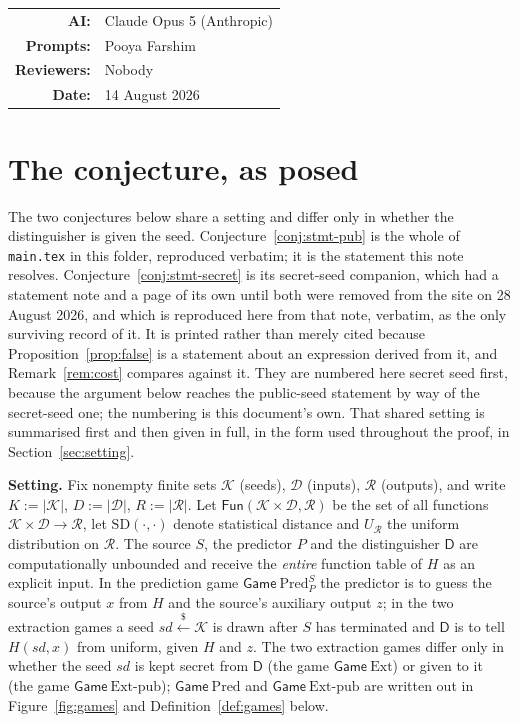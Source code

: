 \documentclass{aicr-solution}
\makeatletter
\newcommand{\Fun}{\mathsf{Fun}}
\newcommand{\Gm}{\mathsf{Game}}
\newcommand{\Pred}{\mathrm{Pred}}
\newcommand{\Ext}{\mathrm{Ext}}
\newcommand{\Extp}{\mathrm{Ext}\text{-}\mathrm{pub}}
\newcommand{\sd}{\mathit{sd}}
\renewcommand{\sample}{\stackrel{{\scriptscriptstyle\$}}{\leftarrow}}
\newcommand{\SD}{\mathrm{SD}}
\newcommand{\calK}{\mathcal{K}}
\newcommand{\calD}{\mathcal{D}}
\newcommand{\calR}{\mathcal{R}}
\newcommand{\AIModelsUsed}{Claude Opus 5 (Anthropic)}
\newcommand{\PromptedBy}{Pooya Farshim}
\newcommand{\ReviewedBy}{Nobody}
\newcommand{\PaperDate}{14 August 2026}
\newcommand{\AIDisclosure}{%
  \begingroup
  \small\centering
  \begin{tabular}{@{}rl@{}}
    \textbf{AI:} & \AIModelsUsed \\
    \textbf{Prompts:} & \PromptedBy \\
    \textbf{Reviewers:} & \ReviewedBy \\
    \textbf{Date:} & \PaperDate \\
  \end{tabular}
  \par
  \endgroup
}
\makeatother
\begin{document}

\vspace{0.6em}
\AIDisclosure

\vspace{1em}

\section*{The conjecture, as posed}\label{sec:posed}

The two conjectures below share a setting and differ only in whether the distinguisher is given
the seed. Conjecture~\ref{conj:stmt-pub} is the whole of \texttt{main.tex} in this folder,
reproduced verbatim; it is the statement this note resolves.
Conjecture~\ref{conj:stmt-secret} is its secret-seed companion, which had a statement note and a
page of its own until both were removed from the site on 28 August 2026, and which is reproduced
here from that note, verbatim, as the only surviving record of it. It is printed rather than merely
cited because Proposition~\ref{prop:false} is a statement about an expression derived from it, and
Remark~\ref{rem:cost} compares against it. They are numbered here secret seed first, because the
argument below reaches the public-seed statement by way of the secret-seed one; the numbering is
this document's own. That shared setting is summarised first and then given in full, in the form
used throughout the proof, in Section~\ref{sec:setting}.

\medskip
\noindent\textbf{Setting.}
Fix nonempty finite sets $\calK$ (seeds), $\calD$ (inputs), $\calR$ (outputs), and write
$K := |\calK|$, $D := |\calD|$, $R := |\calR|$. Let $\Fun(\calK \times \calD, \calR)$ be the set of
all functions $\calK \times \calD \to \calR$, let $\SD(\cdot,\cdot)$ denote statistical distance and
$U_{\calR}$ the uniform distribution on $\calR$. The source $S$, the predictor $P$ and the
distinguisher $\mathsf{D}$ are computationally unbounded and receive the \emph{entire} function
table of $H$ as an explicit input. In the prediction game $\Gm\ \Pred^{S}_{P}$ the predictor is
to guess the source's output $x$ from $H$ and the source's auxiliary output $z$; in the two
extraction games a seed $\sd \sample \calK$ is drawn after $S$ has terminated and $\mathsf{D}$ is
to tell $H(\sd,x)$ from uniform, given $H$ and $z$. The two extraction games differ only in
whether the seed $\sd$ is kept secret from $\mathsf{D}$ (the game $\Gm\ \Ext$) or given to it
(the game $\Gm\ \Extp$); $\Gm\ \Pred$ and $\Gm\ \Extp$ are written out in
Figure~\ref{fig:games} and Definition~\ref{def:games} below.
\end{document}
